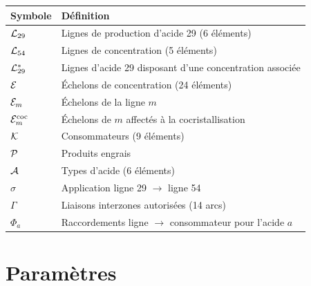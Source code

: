 \begin{longtable}{@{}ll@{}}
\toprule
\textbf{Symbole} & \textbf{Définition} \\
\midrule
\endhead
$\mathcal{L}_{29}$ & Lignes de production d'acide 29 (6 éléments) \\
$\mathcal{L}_{54}$ & Lignes de concentration (5 éléments) \\
$\mathcal{L}^{\ast}_{29}$ & Lignes d'acide 29 disposant d'une concentration associée \\
$\mathcal{E}$ & Échelons de concentration (24 éléments) \\
$\mathcal{E}_m$ & Échelons de la ligne $m$ \\
$\mathcal{E}^{\mathrm{coc}}_m$ & Échelons de $m$ affectés à la cocristallisation \\
$\mathcal{K}$ & Consommateurs (9 éléments) \\
$\mathcal{P}$ & Produits engrais \\
$\mathcal{A}$ & Types d'acide (6 éléments) \\
$\sigma$ & Application ligne 29 $\to$ ligne 54 \\
$\Gamma$ & Liaisons interzones autorisées (14 arcs) \\
$\Phi_a$ & Raccordements ligne $\to$ consommateur pour l'acide $a$ \\
\bottomrule
\end{longtable}

\section*{Paramètres}

